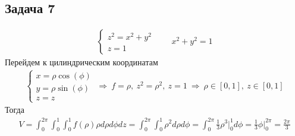 \vskip 0.4in
\begin{comment}
Найдем точки пересечения
\begin{gather*}
z = xy \text{ и } z = 0\\
xy = 0\ \Rightarrow\ x = 0 \text{ или } y = 0\\
\\
x + y + z = 1 \text{ и } z = 0\\
x + y = 1\ \Rightarrow\ x \geqslant 0\quad y \leqslant 1\\
\\
z = xy \text{ и } x + y + z = 1\\
1-x-y = xy\ \Rightarrow\ y = \frac{1-x}{1+x}\quad z = x \cdot \frac{1-x}{1+x}
\end{gather*}
Тогда
\begin{gather*}
V = \int_{0}^{1} \int_{0}^{1} \int_{0}^{x \cdot \frac{1-x}{1+x}} dzdxdy =
\int_{0}^{1} \int_{0}^{1} 2-x+\frac{2}{1+x} dxdy =\\
\int_{0}^{1} 2x - \frac{1}{2} x^2 + 2\ln(x + 1) \bigg|_{0}^{1} dy=
\int_{0}^{1} \frac{3}{2} + 2\ln(2) dy = \frac{3}{2} + 2 \ln(2)
\end{gather*}
\end{comment}

\subsection*{Задача 7}
	\begin{gather*}
	\begin{cases}
		z^2 = x^2 + y^2\\
		z = 1
	\end{cases}\qquad
	x^2 + y^2 = 1
	\end{gather*}
	Перейдем к цилиндрическим координатам
	\begin{gather*}
	\begin{cases}
		x = \rho \cos(\phi)\\
		y = \rho \sin(\phi)\\
		z = z
	\end{cases}
	\ \Rightarrow\ 
	f = \rho,\ z^2 = \rho^2,\ z=1
	\ \Rightarrow\ 
	\rho \in [0,1],\ z \in [0,1]
	\end{gather*}
	Тогда
	\begin{gather*}
		V = \int_{0}^{2\pi} \int_{0}^{1} \int_{0}^{1} f(\rho) \rho d \rho d \phi dz = 
		\int_{0}^{2\pi} \int_{0}^{1} \rho^2 d \rho d \phi =
		\int_{0}^{2\pi} \frac{1}{3} \rho^3 \bigg|_{0}^{1} d \phi =
		\frac{1}{3} \phi \bigg|_{0}^{2\pi} =
		\frac{2\pi}{3}
	\end{gather*}
\vskip 0.4in


